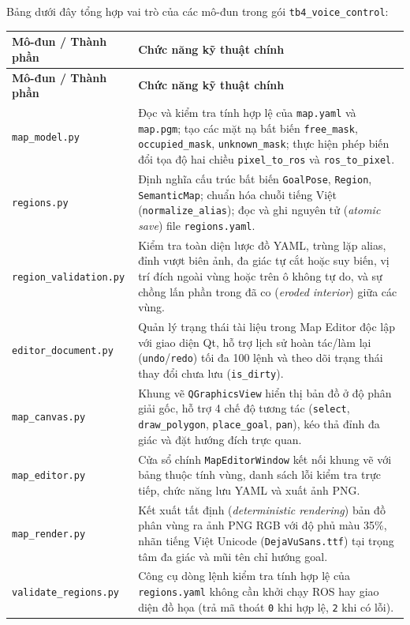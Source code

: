 Bảng dưới đây tổng hợp vai trò của các mô-đun trong gói \texttt{tb4\_voice\_control}:

\begin{longtable}{|p{}|p{}|}
\hline
\textbf{Mô-đun / Thành phần} & \textbf{Chức năng kỹ thuật chính} \\
\hline
\endfirsthead
\hline
\textbf{Mô-đun / Thành phần} & \textbf{Chức năng kỹ thuật chính} \\
\hline
\endhead
\texttt{map\_model.py} & Đọc và kiểm tra tính hợp lệ của \texttt{map.yaml} và \texttt{map.pgm}; tạo các mặt nạ bất biến \texttt{free\_mask}, \texttt{occupied\_mask}, \texttt{unknown\_mask}; thực hiện phép biến đổi tọa độ hai chiều \texttt{pixel\_to\_ros} và \texttt{ros\_to\_pixel}. \\
\hline
\texttt{regions.py} & Định nghĩa cấu trúc bất biến \texttt{GoalPose}, \texttt{Region}, \texttt{SemanticMap}; chuẩn hóa chuỗi tiếng Việt (\texttt{normalize\_alias}); đọc và ghi nguyên tử (\textit{atomic save}) file \texttt{regions.yaml}. \\
\hline
\texttt{region\_validation.py} & Kiểm tra toàn diện lược đồ YAML, trùng lặp alias, đỉnh vượt biên ảnh, đa giác tự cắt hoặc suy biến, vị trí đích ngoài vùng hoặc trên ô không tự do, và sự chồng lấn phần trong đã co (\textit{eroded interior}) giữa các vùng. \\
\hline
\texttt{editor\_document.py} & Quản lý trạng thái tài liệu trong Map Editor độc lập với giao diện Qt, hỗ trợ lịch sử hoàn tác/làm lại (\texttt{undo}/\texttt{redo}) tối đa 100 lệnh và theo dõi trạng thái thay đổi chưa lưu (\texttt{is\_dirty}). \\
\hline
\texttt{map\_canvas.py} & Khung vẽ \texttt{QGraphicsView} hiển thị bản đồ ở độ phân giải gốc, hỗ trợ 4 chế độ tương tác (\texttt{select}, \texttt{draw\_polygon}, \texttt{place\_goal}, \texttt{pan}), kéo thả đỉnh đa giác và đặt hướng đích trực quan. \\
\hline
\texttt{map\_editor.py} & Cửa sổ chính \texttt{MapEditorWindow} kết nối khung vẽ với bảng thuộc tính vùng, danh sách lỗi kiểm tra trực tiếp, chức năng lưu YAML và xuất ảnh PNG. \\
\hline
\texttt{map\_render.py} & Kết xuất tất định (\textit{deterministic rendering}) bản đồ phân vùng ra ảnh PNG RGB với độ phủ màu 35\%, nhãn tiếng Việt Unicode (\texttt{DejaVuSans.ttf}) tại trọng tâm đa giác và mũi tên chỉ hướng goal. \\
\hline
\texttt{validate\_regions.py} & Công cụ dòng lệnh kiểm tra tính hợp lệ của \texttt{regions.yaml} không cần khởi chạy ROS hay giao diện đồ họa (trả mã thoát \texttt{0} khi hợp lệ, \texttt{2} khi có lỗi). \\

\end{longtable}
